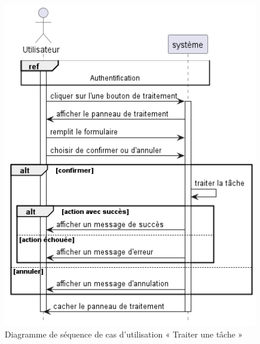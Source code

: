 \begin{figure}[H]
  \centering
  \includegraphics[width=1\textwidth]{out/diagrams/documents/traiter_task/traiter_task}
  \caption{Diagramme de séquence de cas d'utilisation « Traiter une tâche  »}
  \label{fig:sequence_traiter_task}
\end{figure}
